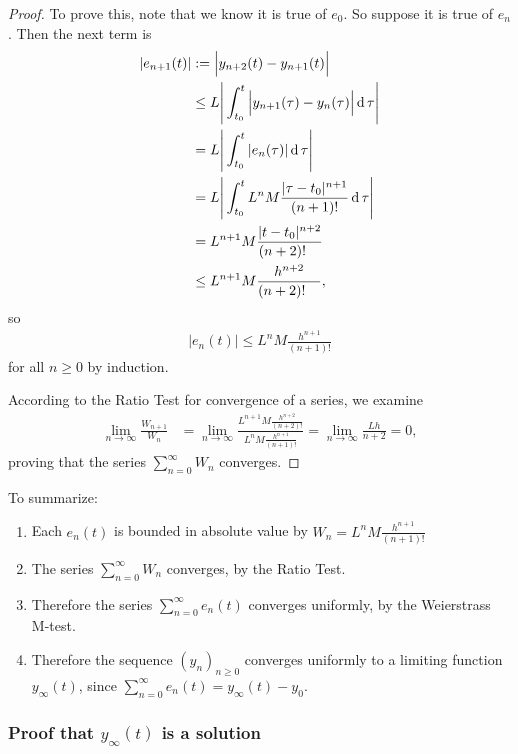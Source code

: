 \begin{proof}
To prove this, note that we know it is true of $e_0$. So suppose it is true of
$e_n$. Then the next term is
\begin{align*}
  |e_{n+1}(t)| & :=   \Big|y_{n+2}(t) - y_{n+1}(t)\Big|\\
              & \leq L\Bigg|\int_{t_0}^t \Big|y_{n+1}(\tau) - y_{n}(\tau)\Big| \operatorname{\text{d}}\tau\Bigg|\\
              &=     L\Bigg|\int_{t_0}^t |e_n(\tau)| \operatorname{\text{d}}\tau\Bigg|\\
              &=     L\Bigg|\int_{t_0}^t L^nM\frac{|\tau - t_0|^{n+1}}{(n+1)!} \operatorname{\text{d}}\tau\Bigg|\\
              &=     L^{n+1}M\frac{|t - t_0|^{n+2}}{(n+2)!^{~~~}}\\
              & \leq L^{n+1}M\frac{h^{n+2}}{(n+2)!^{~~~}},
\end{align*}
so
\begin{align*}
|e_n(t)| \leq L^nM\frac{h^{n+1}}{(n+1)!}
\end{align*}
for all $n \geq 0$ by induction.

According to the Ratio Test for convergence of a series, we examine
\begin{align*}
  \lim_{n\to \infty} \frac{W_{n+1}}{W_n}
  &= \lim_{n\to\infty} \frac{L^{n+1}M\frac{h^{n+2}}{(n+2)!}}
                          {L^nM\frac{h^{n+1}}{(n+1)!}}
   = \lim_{n\to\infty} \frac{Lh}{n+2}
    = 0,
\end{align*}
proving that the series $\sum_{n=0}^\infty W_n$ converges.
\end{proof}

To summarize:
\begin{enumerate}
\item Each $e_n(t)$ is bounded in absolute value by $W_n = L^nM\frac{h^{n+1}}{(n+1)!}$
\item The series $\sum_{n=0}^\infty W_n$ converges, by the Ratio Test.
\item Therefore the series $\sum_{n=0}^\infty e_n(t)$ converges uniformly, by
  the Weierstrass M-test.
\item Therefore the sequence $(y_n)_{n\geq 0}$ converges uniformly to a
  limiting function $y_\infty(t)$, since
  $\sum_{n=0}^\infty e_n(t) = y_\infty(t) - y_0$.
\end{enumerate}

\subsubsection{Proof that $y_\infty(t)$ is a solution}

